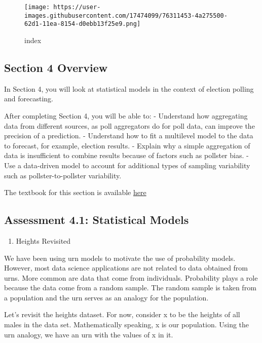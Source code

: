 \documentclass[
]{article}
\providecommand{\tightlist}{%
  \setlength{\itemsep}{0pt}\setlength{\parskip}{0pt}}
\begin{document}
\begin{figure}
\centering
\texttt{[image: https://user-images.githubusercontent.com/17474099/76311453-4a275500-62d1-11ea-8154-d0ebb13f25e9.png]}
\caption{index}
\end{figure}

\hypertarget{section-4-overview}{%
\subsection{Section 4 Overview}\label{section-4-overview}}

In Section 4, you will look at statistical models in the context of
election polling and forecasting.

After completing Section 4, you will be able to: - Understand how
aggregating data from different sources, as poll aggregators do for poll
data, can improve the precision of a prediction. - Understand how to fit
a multilevel model to the data to forecast, for example, election
results. - Explain why a simple aggregation of data is insufficient to
combine results because of factors such as pollster bias. - Use a
data-driven model to account for additional types of sampling
variability such as pollster-to-pollster variability.

The textbook for this section is available
\href{https://rafalab.github.io/dsbook/models.html}{here}

\hypertarget{assessment-4.1-statistical-models}{%
\subsection{Assessment 4.1: Statistical
Models}\label{assessment-4.1-statistical-models}}

\begin{enumerate}
\def\labelenumi{\arabic{enumi}.}
\tightlist
\item
  Heights Revisited
\end{enumerate}

We have been using urn models to motivate the use of probability models.
However, most data science applications are not related to data obtained
from urns. More common are data that come from individuals. Probability
plays a role because the data come from a random sample. The random
sample is taken from a population and the urn serves as an analogy for
the population.

Let's revisit the heights dataset. For now, consider x to be the heights
of all males in the data set. Mathematically speaking, x is our
population. Using the urn analogy, we have an urn with the values of x
in it.
\end{document}
